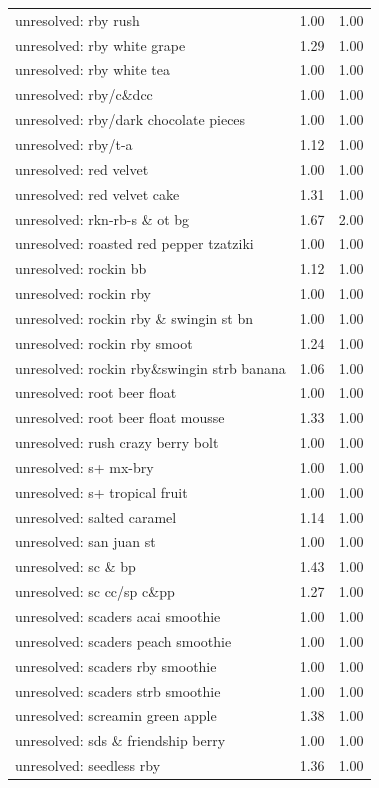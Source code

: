\begin{table}
\begin{tabular}{lrr}
unresolved: rby rush & 1.00 & 1.00 \\
unresolved: rby white grape & 1.29 & 1.00 \\
unresolved: rby white tea & 1.00 & 1.00 \\
unresolved: rby/c\&dcc & 1.00 & 1.00 \\
unresolved: rby/dark chocolate pieces & 1.00 & 1.00 \\
unresolved: rby/t-a & 1.12 & 1.00 \\
unresolved: red velvet & 1.00 & 1.00 \\
unresolved: red velvet cake & 1.31 & 1.00 \\
unresolved: rkn-rb-s \& ot bg & 1.67 & 2.00 \\
unresolved: roasted red pepper tzatziki & 1.00 & 1.00 \\
unresolved: rockin bb & 1.12 & 1.00 \\
unresolved: rockin rby & 1.00 & 1.00 \\
unresolved: rockin rby \& swingin st bn & 1.00 & 1.00 \\
unresolved: rockin rby smoot & 1.24 & 1.00 \\
unresolved: rockin rby\&swingin strb banana & 1.06 & 1.00 \\
unresolved: root beer float & 1.00 & 1.00 \\
unresolved: root beer float mousse & 1.33 & 1.00 \\
unresolved: rush crazy berry bolt & 1.00 & 1.00 \\
unresolved: s+ mx-bry & 1.00 & 1.00 \\
unresolved: s+ tropical fruit & 1.00 & 1.00 \\
unresolved: salted caramel & 1.14 & 1.00 \\
unresolved: san juan st & 1.00 & 1.00 \\
unresolved: sc \& bp & 1.43 & 1.00 \\
unresolved: sc cc/sp c\&pp & 1.27 & 1.00 \\
unresolved: scaders acai smoothie & 1.00 & 1.00 \\
unresolved: scaders peach smoothie & 1.00 & 1.00 \\
unresolved: scaders rby smoothie & 1.00 & 1.00 \\
unresolved: scaders strb smoothie & 1.00 & 1.00 \\
unresolved: screamin green apple & 1.38 & 1.00 \\
unresolved: sds \& friendship berry & 1.00 & 1.00 \\
unresolved: seedless rby & 1.36 & 1.00 \\

\end{tabular}
\end{table}
